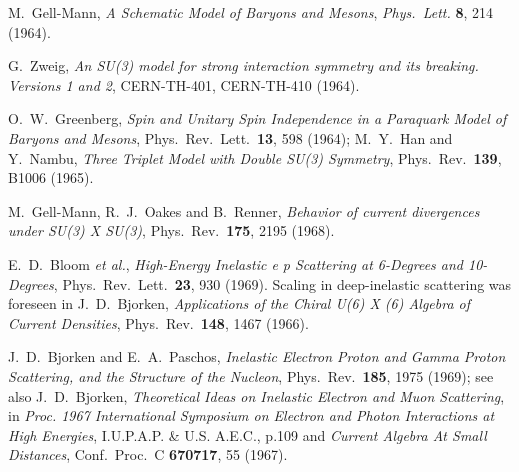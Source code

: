 \documentclass[12pt]{article} %
\begin{document}
\begin{thebibliography}{9}

M.~Gell-Mann,
{\it A Schematic Model of Baryons and Mesons},
  \emph{Phys.\ Lett.}  {\bf 8}, 214 (1964).
  
G.~Zweig,
{\it An SU(3) model for strong interaction symmetry and its breaking. Versions 1 and 2},
  CERN-TH-401, CERN-TH-410 (1964).

O.~W.~Greenberg,
{\it Spin and Unitary Spin Independence in a Paraquark Model of Baryons and Mesons},
  Phys.\ Rev.\ Lett.\  {\bf 13}, 598 (1964);
M.~Y.~Han and Y.~Nambu,
{\it Three Triplet Model with Double SU(3) Symmetry},
  Phys.\ Rev.\  {\bf 139}, B1006 (1965).
  
M.~Gell-Mann, R.~J.~Oakes and B.~Renner,
{\it Behavior of current divergences under SU(3) X SU(3)},
  Phys.\ Rev.\  {\bf 175}, 2195 (1968).

E.~D.~Bloom {\it et al.},
{\it High-Energy Inelastic e p Scattering at 6-Degrees and 10-Degrees},
  Phys.\ Rev.\ Lett.\  {\bf 23}, 930 (1969).
Scaling in deep-inelastic scattering was foreseen in
J.~D.~Bjorken,
{\it Applications of the Chiral U(6) X (6) Algebra of Current Densities},
  Phys.\ Rev.\  {\bf 148}, 1467 (1966).

J.~D.~Bjorken and E.~A.~Paschos,
{\it Inelastic Electron Proton and Gamma Proton Scattering, and the Structure of the Nucleon},
  Phys.\ Rev.\  {\bf 185}, 1975 (1969); see also
J.~D.~Bjorken, {\it Theoretical Ideas on Inelastic Electron and Muon Scattering}, in
{\it Proc. 1967 International Symposium on Electron and Photon Interactions at High Energies}, I.U.P.A.P. \& U.S. A.E.C., p.109 and
{\it Current Algebra At Small Distances},
  Conf.\ Proc.\ C {\bf 670717}, 55 (1967).
  

\end{thebibliography}
\end{document}
